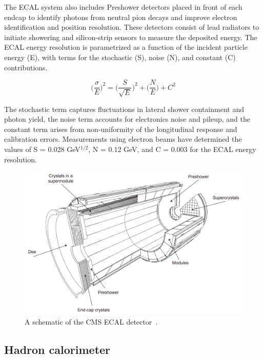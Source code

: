 The ECAL system also includes Preshower detectors placed in front of each endcap to identify photons from neutral pion decays and improve electron identification and position resolution. 
These detectors consist of lead radiators to initiate showering and silicon-strip sensors to measure the deposited energy. 
The ECAL energy resolution is parametrized as a function of the incident particle energy (E), with terms for the stochastic (S), noise (N), and constant (C) contributions.

\begin{equation}
\Big(\frac{\sigma}{E}\Big)^2 = \Big(\frac{S}{\sqrt{E}}\Big)^2 + \Big( \frac{N}{E} \Big) + C^2
\end{equation}

The stochastic term captures fluctuations in lateral shower containment and photon yield, the noise term accounts for electronics noise and pileup, and the constant term arises from non-uniformity of the longitudinal response and calibration errors. 
Measurements using electron beams have determined the values of S = 0.028 GeV$^{1/2}$, N = 0.12 GeV, and C = 0.003 for the ECAL energy resolution. \\

\begin{figure}[!hbtp]
    \centering
    \includegraphics[width=\textwidth]{Figures/ECAL.png}
    \caption{A schematic of the CMS ECAL detector~\cite{CMS_Setup}.}
    \label{fig:ecal}
\end{figure}

\subsection{Hadron calorimeter}

